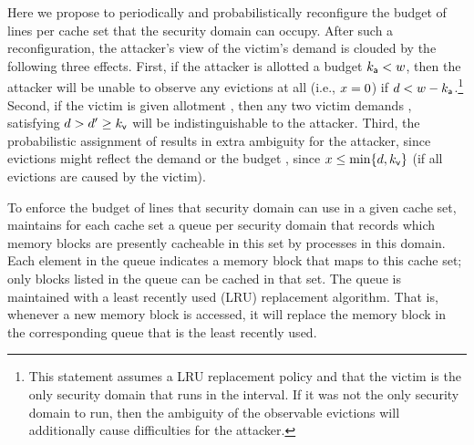 Here we propose to periodically and
probabilistically reconfigure the budget
\linesPerContainer{\containerIdx} of lines per cache set that the
security domain \containerIdx can occupy.  After such a
reconfiguration, the attacker's view of the victim's demand
\victimDemand is clouded by the following three effects.  First, if
the attacker is allotted a budget $k_{\mathsf{a}}
< w$, then the attacker will be unable to observe any
evictions at all (i.e., $x=0$) if $d <
w-k_{\mathsf{a}}$.\footnote{This
  statement assumes a LRU replacement policy and that
  the victim is the only security domain that runs in the \primeprobe
  interval.  If it was not the only security domain to run, then the ambiguity of 
  the observable evictions will additionally cause difficulties for
  the attacker.}  Second, if the victim is given allotment
\linesPerContainer{\victimLabel}, then any two victim demands
\victimDemand, \victimDemandAlt satisfying $d >
d' \ge k_{\mathsf{v}}$ will be
indistinguishable to the attacker.  Third, the probabilistic
assignment of \linesPerContainer{\victimLabel} results in extra
ambiguity for the attacker, since \evictedNmbr evictions might reflect
the demand \victimDemand or the budget
\linesPerContainer{\victimLabel}, since $x \le
\min\{d,k_{\mathsf{v}}\}$ (if all
\evictedNmbr evictions are caused by the victim).

To enforce the budget \linesPerContainer{\containerIdx} of lines that
security domain \containerIdx can use in a given cache set, \cachebar
maintains for each cache set a queue per security domain that records
which memory blocks are presently cacheable in this set by processes
in this domain.  Each element in the queue indicates a memory block
that maps to this cache set; only blocks listed in the queue can be
cached in that set.  The queue is maintained with a least recently
used (LRU) replacement algorithm. That is, whenever a new memory block
is accessed, it will replace the memory block in the corresponding
queue that is the least recently used.

